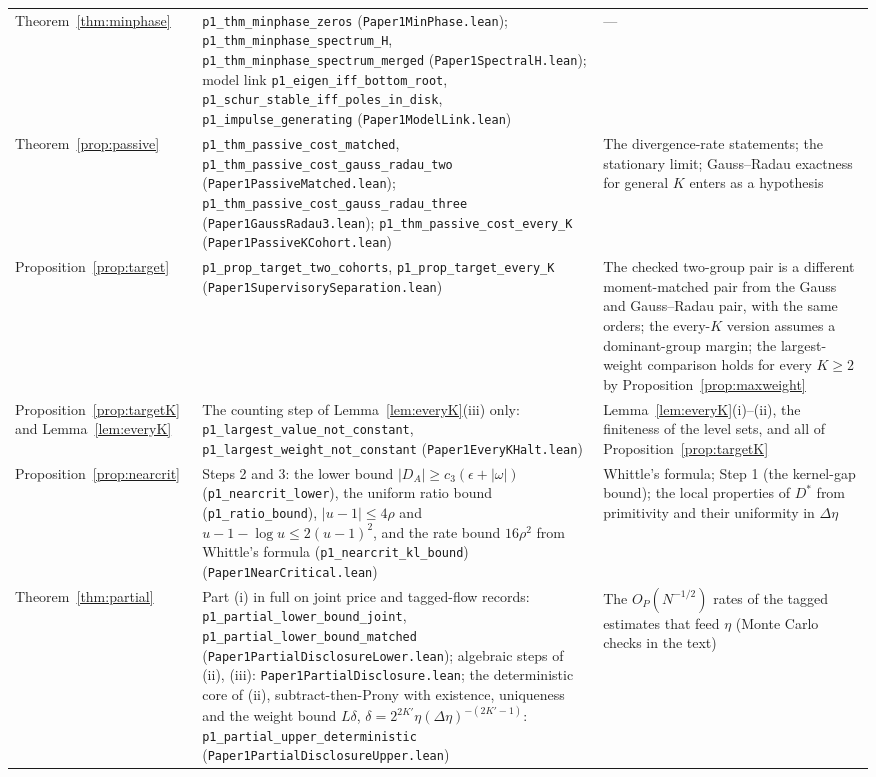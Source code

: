 \documentclass[12pt]{article}
\theoremstyle{definition}
\theoremstyle{remark}
\begin{document}
\begin{longtable}{>{\raggedright\arraybackslash}p{}>{\raggedright\arraybackslash}p{}>{\raggedright\arraybackslash}p{}}
Theorem~\ref{thm:minphase} & \texttt{p1\_thm\_minphase\_zeros} (\nolinkurl{Paper1MinPhase.lean}); \texttt{p1\_thm\_minphase\_spectrum\_H}, \texttt{p1\_thm\_minphase\_spectrum\_merged} (\nolinkurl{Paper1SpectralH.lean}); model link \texttt{p1\_eigen\_iff\_bottom\_root}, \texttt{p1\_schur\_stable\_iff\_poles\_in\_disk}, \texttt{p1\_impulse\_generating} (\nolinkurl{Paper1ModelLink.lean}) & ---\\
Theorem~\ref{prop:passive} & \texttt{p1\_thm\_passive\_cost\_matched}, \texttt{p1\_thm\_passive\_cost\_gauss\_radau\_two} (\nolinkurl{Paper1PassiveMatched.lean}); \nolinkurl{p1_thm_passive_cost_gauss_radau_three} (\nolinkurl{Paper1GaussRadau3.lean}); \texttt{p1\_thm\_passive\_cost\_every\_K} (\nolinkurl{Paper1PassiveKCohort.lean}) & The divergence-rate statements; the stationary limit; Gauss--Radau exactness for general $K$ enters as a hypothesis\\
Proposition~\ref{prop:target} & \texttt{p1\_prop\_target\_two\_cohorts}, \texttt{p1\_prop\_target\_every\_K} (\nolinkurl{Paper1SupervisorySeparation.lean}) & The checked two-group pair is a different moment-matched pair from the Gauss and Gauss--Radau pair, with the same orders; the every-$K$ version assumes a dominant-group margin; the largest-weight comparison holds for every $K\ge 2$ by Proposition~\ref{prop:maxweight}\\
Proposition~\ref{prop:targetK} and Lemma~\ref{lem:everyK} & The counting step of Lemma~\ref{lem:everyK}(iii) only: \texttt{p1\_largest\_value\_not\_constant}, \texttt{p1\_largest\_weight\_not\_constant} (\nolinkurl{Paper1EveryKHalt.lean}) & Lemma~\ref{lem:everyK}(i)--(ii), the finiteness of the level sets, and all of Proposition~\ref{prop:targetK}\\
Proposition~\ref{prop:nearcrit} & Steps 2 and 3: the lower bound $|D_A|\ge c_3(\epsilon+|\omega|)$ (\texttt{p1\_nearcrit\_lower}), the uniform ratio bound (\texttt{p1\_ratio\_bound}), $|u-1|\le4\rho$ and $u-1-\log u\le2(u-1)^2$, and the rate bound $16\rho^2$ from Whittle's formula (\texttt{p1\_nearcrit\_kl\_bound}) (\nolinkurl{Paper1NearCritical.lean}) & Whittle's formula; Step 1 (the kernel-gap bound); the local properties of $D^*$ from primitivity and their uniformity in $\Delta\eta$\\
Theorem~\ref{thm:partial} & Part (i) in full on joint price and tagged-flow records: \texttt{p1\_partial\_lower\_bound\_joint}, \texttt{p1\_partial\_lower\_bound\_matched} (\nolinkurl{Paper1PartialDisclosureLower.lean}); algebraic steps of (ii), (iii): \nolinkurl{Paper1PartialDisclosure.lean}; the deterministic core of (ii), subtract-then-Prony with existence, uniqueness and the weight bound $L\delta$, $\delta=2^{2K'}\eta(\Delta\eta)^{-(2K'-1)}$: \texttt{p1\_partial\_upper\_deterministic} (\nolinkurl{Paper1PartialDisclosureUpper.lean}) & The $O_P(N^{-1/2})$ rates of the tagged estimates that feed $\eta$ (Monte Carlo checks in the text)\\

\end{longtable}
\end{document}
